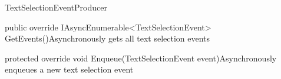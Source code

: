 \begin{class}{TextSelectionEventProducer} 
    


    \begin{methods}
        \begin{method}{public override IAsyncEnumerable<TextSelectionEvent> GetEvents()}{Asynchronously gets all text selection events}
        \end{method}
        \begin{method}{protected override void Enqueue(TextSelectionEvent event)}{Asynchronously enqueues a new text selection event}
            \begin{parameters}
            \end{parameters}
        \end{method}
    \end{methods}
\end{class}

